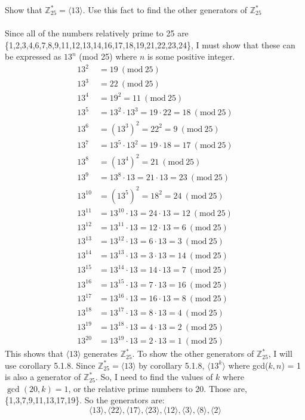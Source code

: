 \documentclass[titlepage]{article}
\newcommand{\Mod}[1]{\ (\mathrm{mod}\ #1)}
\newenvironment{problem}[2][Problem]{\begin{trivlist}
\item[\hskip \labelsep {\bfseries #1}\hskip \labelsep {\bfseries #2.}]}{\end{trivlist}}
\begin{document}
\begin{problem}{10}
Show that $\mathbb{Z}^*_{25} = \langle 13 \rangle$. Use this fact to find the other generators of $\mathbb{Z}^*_{25}$
\\ \\
Since all of the numbers relatively prime to 25 are \{1,2,3,4,6,7,8,9,11,12,13,14,16,17,18,19,21,22,23,24\},  I must show that these can be expressed as $13^n$ (mod 25) where $n$ is some positive integer.
\begin{align*}
13^2 &= 19 \Mod{25}\\
13^3 &= 22 \Mod{25}\\
13^4 &= 19^2 = 11 \Mod{25} \\
13^5 &= 13^2 \cdot 13^3 = 19\cdot22 = 18 \Mod{25} \\
13^6 &= (13^3)^2 = 22^2 =  9 \Mod{25}\\
13^7 &= 13^5 \cdot 13^2 = 19\cdot18 = 17 \Mod{25} \\
13^8 &= (13^4)^2 = 21 \Mod{25} \\
13^9 &= 13^8 \cdot 13 = 21\cdot13 = 23 \Mod{25} \\
13^{10} &= (13^5)^2 = 18^2 = 24 \Mod{25}\\
13^{11} &= 13^{10} \cdot 13 = 24\cdot 13 = 12 \Mod{25} \\
13^{12} &= 13^{11}\cdot 13 =  12\cdot 13 = 6 \Mod{25} \\
13^{13} &= 13^{12} \cdot 13  = 6 \cdot 13 = 3 \Mod{25} \\
13^{14} &= 13^{13} \cdot 13 = 3 \cdot 13 = 14 \Mod{25}\\
13^{15} &= 13^{14} \cdot 13 = 14 \cdot 13 = 7 \Mod{25} \\
13^{16} &= 13^{15} \cdot 13 = 7 \cdot 13 = 16 \Mod{25}\\
13^{17} &= 13^{16} \cdot 13 = 16 \cdot 13 = 8 \Mod{25} \\
13^{18} &= 13^{17} \cdot 13 = 8 \cdot 13 = 4 \Mod{25} \\
13^{19} &= 13^{18} \cdot 13 = 4 \cdot 13 = 2 \Mod{25} \\
13^{20} &= 13^{19} \cdot 13 = 2 \cdot 13 = 1 \Mod{25}
\end{align*}
This shows that $\langle 13 \rangle$ generates $\mathbb{Z}^*_{25}$. To show the other generators of $\mathbb{Z}^*_{25}$, I will use corollary 5.1.8. Since $\mathbb{Z}^*_{25} = \langle 13 \rangle$ by corollary 5.1.8, $\langle 13^k \rangle$ where gcd($k,n$) = 1 is also a generator of $\mathbb{Z}^*_{25}$. So, I need to find the values of $k$ where $\gcd(20,k) = 1$, or the relative prime numbers to 20. Those are, \{1,3,7,9,11,13,17,19\}. So the generators are:
$$\langle 13 \rangle, \langle 22 \rangle, \langle 17 \rangle, \langle 23 \rangle, \langle 12 \rangle, \langle 3 \rangle, \langle 8 \rangle, \langle 2 \rangle$$
\end{problem}
\end{document}
